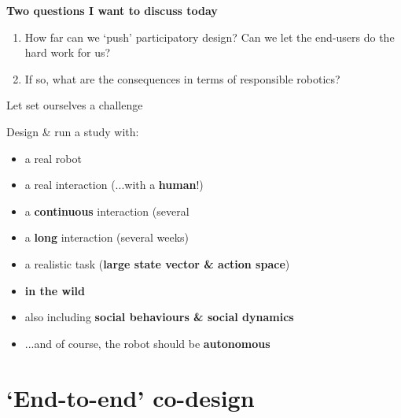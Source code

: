 \documentclass[xcolor=table,aspectratio=169]{beamer}
\begin{document}
\begin{frame}[plain]

    \Large {\bf Two questions I want to discuss today}
    
    \begin{enumerate}
        \item<+-> How far can we `push' participatory design? Can we let the
            end-users do the hard work for us?

        \item<+-> If so, what are the consequences in terms of responsible
            robotics?
    \end{enumerate}

\end{frame}

\begin{frame}{Let set ourselves a challenge}

\begin{exampleblock}{Design \& run a study with:}
    
    \begin{itemize}
        \item<+-> a real robot
        \item<+-> a real interaction (...with a \textbf{human}!)
        \item<+-> a \textbf{continuous} interaction (several
        \item<+-> a \textbf{long} interaction (several weeks)
        \item<+-> a realistic task (\textbf{large state vector \& action space})
        \item<+-> \textbf{in the wild}
        \item<+-> also including \textbf{social behaviours \& social dynamics}
        \item<+-> ...and of course, the robot should be \textbf{autonomous}
    \end{itemize}
\end{exampleblock}

\end{frame}

\section{`End-to-end' co-design}

\end{document}
